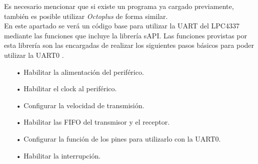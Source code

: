 \documentclass[12pt,letterpaper]{article}
\begin{document}
Es necesario mencionar que si existe un programa ya cargado previamente, también es posible utilizar \textit{Octoplus} de forma similar.
 \\
 
En este apartado se verá un código base para utilizar la UART del LPC4337 mediante las funciones que incluye la librería sAPI. Las funciones provistas por esta librería son las encargadas de realizar los siguientes pasos básicos para poder utilizar la UART0 \cite{manuallpcuart}.

\begin{enumerate}
\item[•]Habilitar la alimentación del periférico.
\item[•]Habilitar el clock al periférico.
\item[•]Configurar la velocidad de transmisión.
\item[•]Habilitar las FIFO del transmisor y el receptor.
\item[•]Configurar la función de los pines para utilizarlo con la UART0.
\item[•]Habilitar la interrupción.
\end{enumerate}
\end{document}
